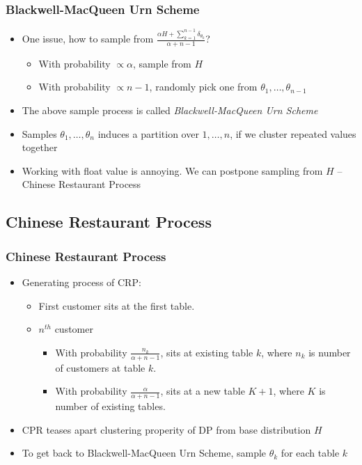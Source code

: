 \documentclass{beamer}
\begin{document}
\begin{frame}
	\frametitle{Blackwell-MacQueen Urn Scheme}
	\begin{itemize}
		\item One issue, how to sample from $\frac{\alpha H + \sum_{k=1}^{n-1}\delta_{\theta_k}}{\alpha+n-1}$?
		\begin{itemize}
			\item With probability $\propto \alpha$, sample from $H$
			\item With probability $\propto n-1$, randomly pick one from $\theta_1,\ldots,
			 \theta_{n-1}$
		\end{itemize}
		\item The above sample process is called {\em Blackwell-MacQueen Urn Scheme}
		\item Samples $\theta_1, \ldots, \theta_n$ induces a partition over $1,\ldots,n$, if we cluster repeated values together
		\item Working with float value is annoying. We can postpone sampling from $H$ -- {\color{red}Chinese Restaurant Process}
	\end{itemize}
\end{frame}

\subsection{Chinese Restaurant Process}
\begin{frame}
\frametitle{Chinese Restaurant Process}
	\begin{itemize}
		\item Generating process of CRP:
		\begin{itemize}
			\item First customer sits at the first table.
			\item $n^{th}$ customer
				\begin{itemize}
					\item With probability $\frac{n_k}{\alpha+n-1}$, sits at existing table $k$, where $n_k$ is number of customers at table $k$.
					\item With probability $\frac{\alpha}{\alpha+n-1}$, sits at a new table $K+1$, where $K$ is number of existing tables.
				\end{itemize}
		\end{itemize}
		
		\item CPR teases apart clustering properity of DP from base distribution $H$
		\item To get back to Blackwell-MacQueen Urn Scheme, sample $\theta_k$ for each table $k$
	\end{itemize}
\end{frame}
\end{document}
